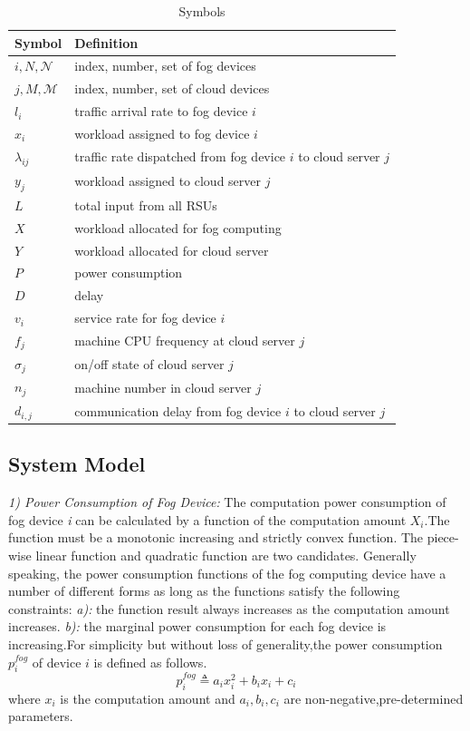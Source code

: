 \documentclass[twoside,twocolumn]{article}
\begin{document}
\begin{table}[h]
	\centering
	\begin{tabular}{p{1cm}p{6cm}}
	\hline
	Symbol & Definition \\\hline
	$i,N,\mathcal{N}$ & index, number, set of fog devices\\
	$j,M,\mathcal{M}$ & index, number, set of cloud devices\\
	$l_i$             & traffic arrival rate to fog device $i$\\
	$x_i$             & workload assigned to fog device $i$\\
	$\lambda_{ij}$    & traffic rate dispatched from fog device $i$ to cloud server $j$\\
	$y_j$             & workload assigned to cloud server $j$\\
	$L$               & total input from all RSUs\\
	$X$               & workload allocated for fog computing\\
	$Y$               & workload allocated for cloud server\\
	$P$               & power consumption\\
	$D$               & delay\\
	$v_i$             & service rate for fog device $i$\\
	$f_j$             & machine CPU frequency at cloud server $j$\\
	$\sigma_j$        & on/off state of cloud server $j$\\
	$n_j$             & machine number in cloud server $j$\\
	$d_{i,j}$         & communication delay from fog device $i$ to cloud server $j$\\\hline
	\end{tabular}
	\caption{Symbols}
\end{table}


\subsection{System Model}

\textit{1) Power Consumption of Fog Device:} The computation power consumption of fog device \textit{i} can be calculated by a function of the computation amount $X_i$.The function must be a monotonic increasing and strictly convex function. The piece-wise linear function and quadratic function are two candidates. Generally speaking, the power consumption functions of the fog computing device have a number of different forms as long as the functions satisfy the following constraints: \textit{a):}  the function result always increases as the computation amount increases. \textit{b):} the marginal power consumption for each fog device is increasing.For simplicity but without loss of generality,the power consumption $p_i^{fog} $ of device $i$ is defined as follows.
$$ p_i^{fog} \triangleq a_ix_i^2+b_ix_i+c_i $$
where $x_i$ is the computation amount and $a_i,b_i,c_i$ are non-negative,pre-determined parameters. 
\end{document}
